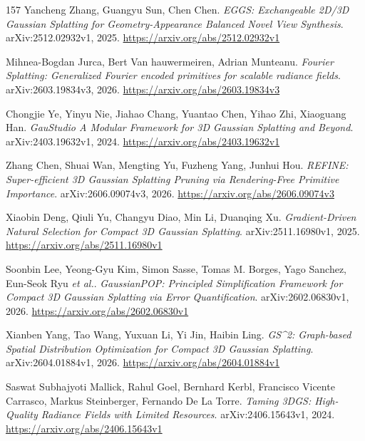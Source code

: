 \documentclass[11pt,a4paper]{article}
\begin{document}
\begin{thebibliography}{157}
Yancheng Zhang, Guangyu Sun, Chen Chen.
\newblock \emph{EGGS: Exchangeable 2D/3D Gaussian Splatting for Geometry-Appearance Balanced Novel View Synthesis}.
\newblock arXiv:2512.02932v1, 2025.
\newblock \url{https://arxiv.org/abs/2512.02932v1}

Mihnea-Bogdan Jurca, Bert Van hauwermeiren, Adrian Munteanu.
\newblock \emph{Fourier Splatting: Generalized Fourier encoded primitives for scalable radiance fields}.
\newblock arXiv:2603.19834v3, 2026.
\newblock \url{https://arxiv.org/abs/2603.19834v3}

Chongjie Ye, Yinyu Nie, Jiahao Chang, Yuantao Chen, Yihao Zhi, Xiaoguang Han.
\newblock \emph{GauStudio A Modular Framework for 3D Gaussian Splatting and Beyond}.
\newblock arXiv:2403.19632v1, 2024.
\newblock \url{https://arxiv.org/abs/2403.19632v1}

Zhang Chen, Shuai Wan, Mengting Yu, Fuzheng Yang, Junhui Hou.
\newblock \emph{REFINE: Super-efficient 3D Gaussian Splatting Pruning via Rendering-Free Primitive Importance}.
\newblock arXiv:2606.09074v3, 2026.
\newblock \url{https://arxiv.org/abs/2606.09074v3}

Xiaobin Deng, Qiuli Yu, Changyu Diao, Min Li, Duanqing Xu.
\newblock \emph{Gradient-Driven Natural Selection for Compact 3D Gaussian Splatting}.
\newblock arXiv:2511.16980v1, 2025.
\newblock \url{https://arxiv.org/abs/2511.16980v1}

Soonbin Lee, Yeong-Gyu Kim, Simon Sasse, Tomas M. Borges, Yago Sanchez, Eun-Seok Ryu \emph{et al.}.
\newblock \emph{GaussianPOP: Principled Simplification Framework for Compact 3D Gaussian Splatting via Error Quantification}.
\newblock arXiv:2602.06830v1, 2026.
\newblock \url{https://arxiv.org/abs/2602.06830v1}

Xianben Yang, Tao Wang, Yuxuan Li, Yi Jin, Haibin Ling.
\newblock \emph{GS\textasciicircum{}2: Graph-based Spatial Distribution Optimization for Compact 3D Gaussian Splatting}.
\newblock arXiv:2604.01884v1, 2026.
\newblock \url{https://arxiv.org/abs/2604.01884v1}

Saswat Subhajyoti Mallick, Rahul Goel, Bernhard Kerbl, Francisco Vicente Carrasco, Markus Steinberger, Fernando De La Torre.
\newblock \emph{Taming 3DGS: High-Quality Radiance Fields with Limited Resources}.
\newblock arXiv:2406.15643v1, 2024.
\newblock \url{https://arxiv.org/abs/2406.15643v1}


\end{thebibliography}
\end{document}
